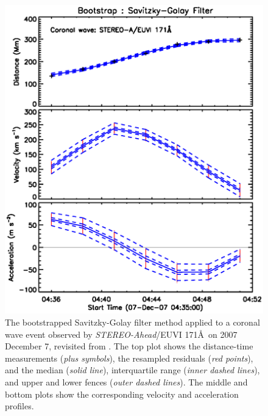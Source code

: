 \documentclass[structabstract]{aa}
\begin{document}
\begin{figure}
\centering
\includegraphics[scale=0.6, trim=0 40 0 30]{images/fit_kinscasestudy_wave20071207.eps}
\caption{The bootstrapped Savitzky-Golay filter method applied to a coronal wave event observed by \emph{STEREO-Ahead}/EUVI 171\AA\ on 2007 December 7, revisited from \citet{2011A&A...531A..42L}. The top plot shows the distance-time measurements (\emph{plus symbols}), the resampled residuals (\emph{red points}), and the median (\emph{solid line}), interquartile range (\emph{inner dashed lines}), and upper and lower fences (\emph{outer dashed lines}). The middle and bottom plots show the corresponding velocity and acceleration profiles.}
\label{fig_savgol_wave}
\end{figure}
\end{document}
